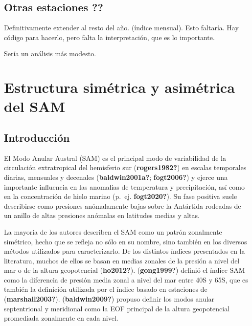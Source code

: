 \documentclass[12pt,oneside]{reedthesis}
\begin{document}
\hypertarget{otras-estaciones}{%
\section{Otras estaciones ??}\label{otras-estaciones}}

Definitivamente extender al resto del año.
(índice mensual).
Esto faltaría.
Hay código para hacerlo, pero falta la interpretación, que es lo importante.

Sería un análisis más modesto.

\hypertarget{estructura-simuxe9trica-y-asimuxe9trica-del-sam}{%
\chapter{Estructura simétrica y asimétrica del SAM}\label{estructura-simuxe9trica-y-asimuxe9trica-del-sam}}

\hypertarget{introducciuxf3n-1}{%
\section{Introducción}\label{introducciuxf3n-1}}

El Modo Anular Austral (SAM) es el principal modo de variabilidad de la circulación extratropical del hemisferio sur (\textbf{rogers1982?}) en escalas temporales diarias, mensuales y decenales (\textbf{baldwin2001a?}; \textbf{fogt2006?}) y ejerce una importante influencia en las anomalías de temperatura y precipitación, así como en la concentración de hielo marino (p.~ej. \textbf{fogt2020?}).
Su fase positiva suele describirse como presiones anómalamente bajas sobre la Antártida rodeadas de un anillo de altas presiones anómalas en latitudes medias y altas.

La mayoría de los autores describen el SAM como un patrón zonalmente simétrico, hecho que se refleja no sólo en su nombre, sino también en los diversos métodos utilizados para caracterizarlo.
De los distintos índices presentados en la literatura, muchos de ellos se basan en medias zonales de la presión a nivel del mar o de la altura geopotencial (\textbf{ho2012?}).
(\textbf{gong1999?}) definió el índice SAM como la diferencia de presión media zonal a nivel del mar entre 40\degree S y 65\degree S, que es también la definición utilizada por el índice basado en estaciones de (\textbf{marshall2003?}).
(\textbf{baldwin2009?}) propuso definir los modos anular septentrional y meridional como la EOF principal de la altura geopotencial promediada zonalmente en cada nivel.
\end{document}
